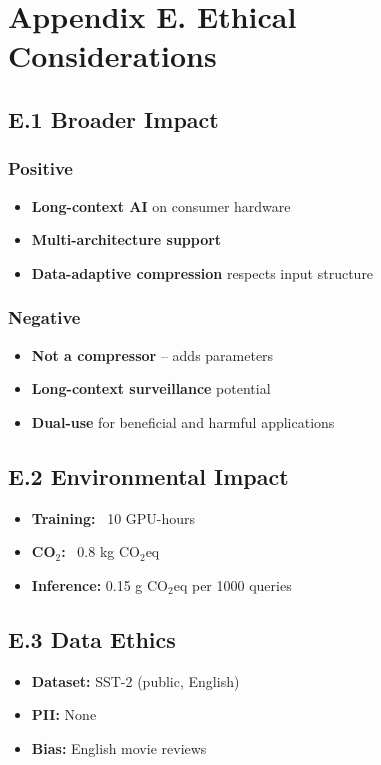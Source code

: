
\section{Appendix E. Ethical Considerations}

\subsection{E.1 Broader Impact}

\subsubsection{Positive}
\begin{itemize}
\item \textbf{Long-context AI} on consumer hardware
\item \textbf{Multi-architecture support}
\item \textbf{Data-adaptive compression} respects input structure

\end{itemize}
\subsubsection{Negative}
\begin{itemize}
\item \textbf{Not a compressor} -- adds parameters
\item \textbf{Long-context surveillance} potential
\item \textbf{Dual-use} for beneficial and harmful applications

\end{itemize}
\subsection{E.2 Environmental Impact}

\begin{itemize}
\item \textbf{Training:} ~10 GPU-hours
\item \textbf{CO$_2$:} ~0.8 kg CO$_2$eq
\item \textbf{Inference:} 0.15 g CO$_2$eq per 1000 queries

\end{itemize}
\subsection{E.3 Data Ethics}

\begin{itemize}
\item \textbf{Dataset:} SST-2 (public, English)
\item \textbf{PII:} None
\item \textbf{Bias:} English movie reviews

\end{itemize}
